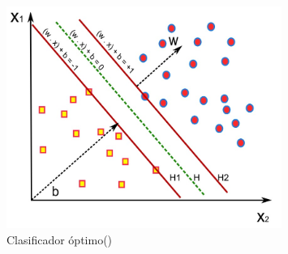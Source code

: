 \begin{figure}[H]
	\begin{center}
		\includegraphics[width=0.8\textwidth]{2/figures/svm2.jpeg}
		\caption{Clasificador óptimo(\cite{tecnica3})}
	\end{center}
\end{figure}

